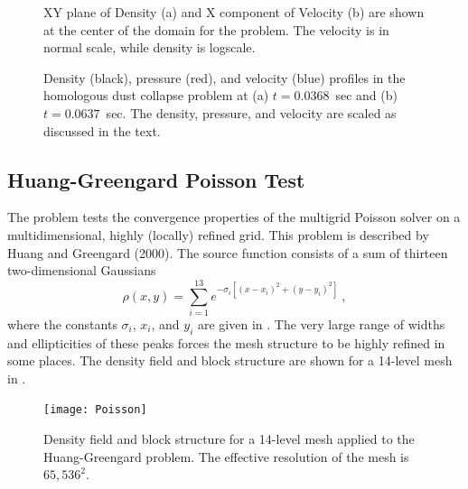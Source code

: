 \begin{figure}[t]
\begin{center}
\caption{\label{Fig:dust_flash3}
  XY plane of Density (a) and X component of Velocity (b) are shown at the center of the domain
for the  problem. The velocity is in normal scale, while density is logscale.
}
\end{center}
\end{figure}

\begin{figure}[t]
\begin{center}
\caption{\label{Fig:dust collapse}
  Density (black), pressure (red), and velocity (blue) profiles
  in the homologous dust collapse problem at (a) $t=0.0368$~sec
  and (b) $t=0.0637$~sec. The density, pressure, and velocity are
  scaled as discussed in the text.
}
\end{center}
\end{figure}
\clearpage



\subsection{Huang-Greengard Poisson Test}
\label{Sec:SimulationPoisTest}

The  problem tests the convergence properties of
the multigrid Poisson solver on a multidimensional, highly (locally) refined
grid. This problem is described by Huang and Greengard (2000).
The source function consists of a sum of thirteen two-dimensional
Gaussians
\begin{equation}
\rho(x,y) = \sum_{i=1}^{13} e^{-\sigma_i[(x-x_i)^2+(y-y_i)^2]}\ ,
\end{equation}
where the constants $\sigma_i$, $x_i$, and $y_i$ are given in
. The very large range of widths and
ellipticities of these peaks forces the mesh structure to be highly
refined in some places.  The density field and block structure are
shown for a 14-level mesh in .

\begin{figure}[!ht]
\begin{center}
{\leavevmode\texttt{[image: Poisson]}}
\end{center}
\caption{\label{Fig:HG source fctn} Density field and block structure
for a 14-level mesh applied to the Huang-Greengard  problem. The effective
resolution of the mesh is $65,536^2$.}
\end{figure}


